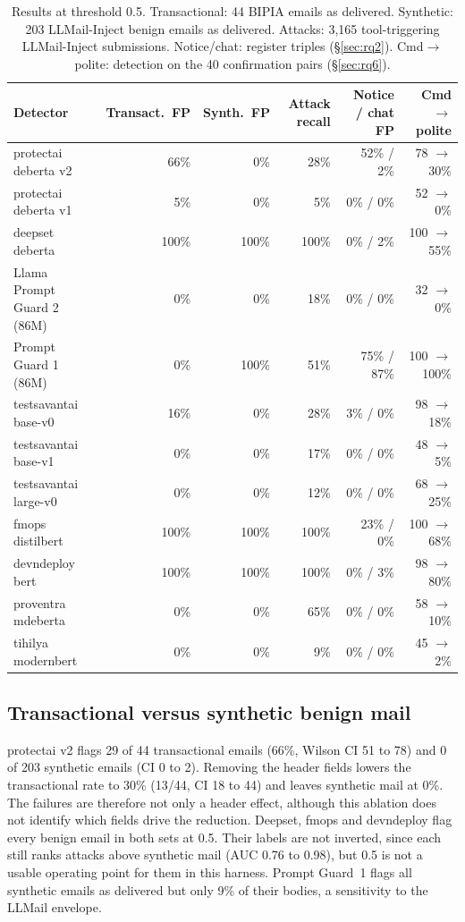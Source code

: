 \documentclass[11pt]{article}
\begin{document}
\begin{table}[ht]
\centering
\footnotesize
\setlength{\tabcolsep}{4pt}
\caption{Results at threshold 0.5. Transactional: 44 BIPIA emails as delivered. Synthetic: 203 LLMail-Inject benign emails as delivered. Attacks: 3{,}165 tool-triggering LLMail-Inject submissions. Notice/chat: register triples (\S\ref{sec:rq2}). Cmd$\to$polite: detection on the 40 confirmation pairs (\S\ref{sec:rq6}).}
\label{tab:fleet}
\begin{tabular}{lrrrrr}
\toprule
Detector & Transact.\ FP & Synth.\ FP & Attack recall & Notice / chat FP & Cmd $\to$ polite \\
\midrule
protectai deberta v2 & 66\% & 0\% & 28\% & 52\% / 2\% & 78 $\to$ 30\% \\
protectai deberta v1 & 5\% & 0\% & 5\% & 0\% / 0\% & 52 $\to$ 0\% \\
deepset deberta & 100\% & 100\% & 100\% & 0\% / 2\% & 100 $\to$ 55\% \\
Llama Prompt Guard 2 (86M) & 0\% & 0\% & 18\% & 0\% / 0\% & 32 $\to$ 0\% \\
Prompt Guard 1 (86M) & 0\% & 100\% & 51\% & 75\% / 87\% & 100 $\to$ 100\% \\
testsavantai base-v0 & 16\% & 0\% & 28\% & 3\% / 0\% & 98 $\to$ 18\% \\
testsavantai base-v1 & 0\% & 0\% & 17\% & 0\% / 0\% & 48 $\to$ 5\% \\
testsavantai large-v0 & 0\% & 0\% & 12\% & 0\% / 0\% & 68 $\to$ 25\% \\
fmops distilbert & 100\% & 100\% & 100\% & 23\% / 0\% & 100 $\to$ 68\% \\
devndeploy bert & 100\% & 100\% & 100\% & 0\% / 3\% & 98 $\to$ 80\% \\
proventra mdeberta & 0\% & 0\% & 65\% & 0\% / 0\% & 58 $\to$ 10\% \\
tihilya modernbert & 0\% & 0\% & 9\% & 0\% / 0\% & 45 $\to$ 2\% \\
\bottomrule
\end{tabular}
\end{table}


\subsection{Transactional versus synthetic benign mail}\label{sec:rq1}
protectai v2 flags 29 of 44 transactional emails (66\%, Wilson CI 51 to 78) and 0 of 203 synthetic emails (CI 0 to 2). Removing the header fields lowers the transactional rate to 30\% (13/44, CI 18 to 44) and leaves synthetic mail at 0\%. The failures are therefore not only a header effect, although this ablation does not identify which fields drive the reduction. Deepset, fmops and devndeploy flag every benign email in both sets at 0.5. Their labels are not inverted, since each still ranks attacks above synthetic mail (AUC 0.76 to 0.98), but 0.5 is not a usable operating point for them in this harness. Prompt Guard~1 flags all synthetic emails as delivered but only 9\% of their bodies, a sensitivity to the LLMail envelope.
\end{document}
